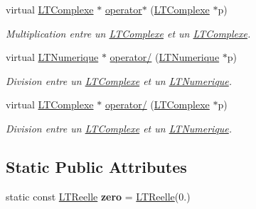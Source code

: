 \begin{DoxyCompactItemize}
virtual \hyperlink{class_l_t_complexe}{L\+T\+Complexe} $\ast$ \hyperlink{class_l_t_reelle_a6411ae704917972524001f81862814ff}{operator$\ast$} (\hyperlink{class_l_t_complexe}{L\+T\+Complexe} $\ast$p)
\begin{DoxyCompactList}\small\item\em Multiplication entre un \hyperlink{class_l_t_complexe}{L\+T\+Complexe} et un \hyperlink{class_l_t_complexe}{L\+T\+Complexe}. \end{DoxyCompactList}\item 
virtual \hyperlink{class_l_t_numerique}{L\+T\+Numerique} $\ast$ \hyperlink{class_l_t_reelle_a088c4683ed4077bceffca599f24fcee8}{operator/} (\hyperlink{class_l_t_numerique}{L\+T\+Numerique} $\ast$p)
\begin{DoxyCompactList}\small\item\em Division entre un \hyperlink{class_l_t_complexe}{L\+T\+Complexe} et un \hyperlink{class_l_t_numerique}{L\+T\+Numerique}. \end{DoxyCompactList}\item 
virtual \hyperlink{class_l_t_complexe}{L\+T\+Complexe} $\ast$ \hyperlink{class_l_t_reelle_a8260eb6ee9db3bea9798c49d1993060d}{operator/} (\hyperlink{class_l_t_complexe}{L\+T\+Complexe} $\ast$p)
\begin{DoxyCompactList}\small\item\em Division entre un \hyperlink{class_l_t_complexe}{L\+T\+Complexe} et un \hyperlink{class_l_t_numerique}{L\+T\+Numerique}. \end{DoxyCompactList}\end{DoxyCompactItemize}
\subsection*{Static Public Attributes}
\begin{DoxyCompactItemize}
\item 
static const \hyperlink{class_l_t_reelle}{L\+T\+Reelle} {\bfseries zero} = \hyperlink{class_l_t_reelle}{L\+T\+Reelle}(0.)\hypertarget{class_l_t_reelle_af2b84064510c05ba009fa856d59d35f9}{}\label{class_l_t_reelle_af2b84064510c05ba009fa856d59d35f9}

\end{DoxyCompactItemize}
